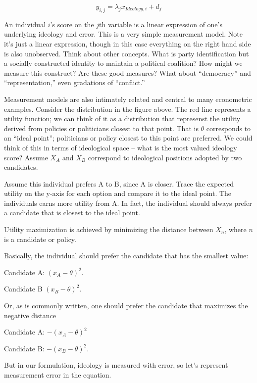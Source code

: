 \documentclass[
]{book}
\begin{document}
\begin{equation}
y_{i,j}=\lambda_j x_{Ideology,i}+d_j
\end{equation}

An individual \(i\)'s score on the \(j\)th variable is a linear expression of one's underlying ideology and error. This is a very simple measurement model. Note it's just a linear expression, though in this case everything on the right hand side is also unobserved. Think about other concepts. What is party identification but a socially constructed identity to maintain a political coalition? How might we measure this construct? Are these good measures? What about ``democracy'' and ``representation,'' even gradations of ``conflict.''

Measurement models are also intimately related and central to many econometric examples. Consider the distribution in the figure above. The red line represents a utility function; we can think of it as a distribution that represenst the utility derived from policies or politicians closest to that point. That is \(\theta\) corresponds to an ``ideal point''; politicians or policy closest to this point are preferred. We could think of this in terms of ideological space -- what is the most valued ideology score? Assume \(X_A\) and \(X_B\) correspond to ideological positions adopted by two candidates.

Assume this individual prefers A to B, since A is closer. Trace the expected utility on the y-axis for each option and compare it to the ideal point. The individuals earns more utility from A. In fact, the individual should always prefer a candidate that is closest to the ideal point.

Utility maximization is achieved by minimizing the distance between \(X_n\), where \(n\) is a candidate or policy.

Basically, the individual should prefer the candidate that has the smallest value:

Candidate A: \((x_{A}-\theta)^2\).

Candidate B \((x_{B}-\theta)^2\).

Or, as is commonly written, one should prefer the candidate that maximizes the negative distance

Candidate A: \(-(x_{A}-\theta)^2\)

Candidate B: \(-(x_{B}-\theta)^2\).

But in our formulation, ideology is measured with error, so let's represent measurement error in the equation.
\end{document}
